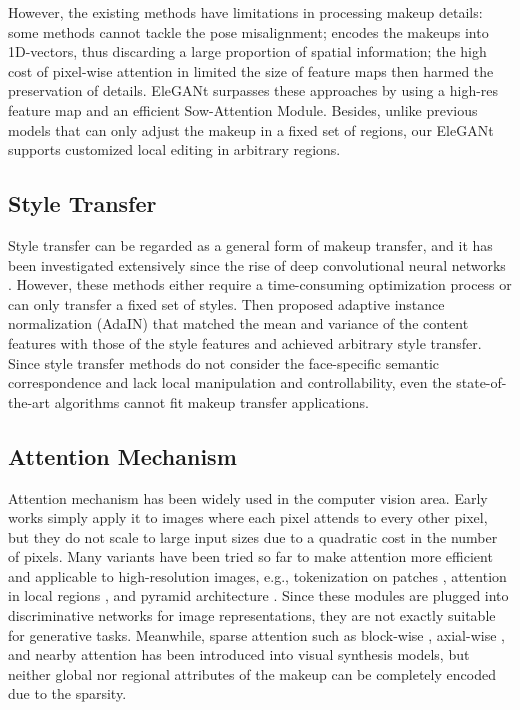 However, the existing methods have limitations in processing makeup details: some methods \cite{BeautyGAN,LADN} cannot tackle the pose misalignment; \cite{SCGAN} encodes the makeups into 1D-vectors, thus discarding a large proportion of spatial information; the high cost of pixel-wise attention in \cite{PSGAN,FAT} limited the size of feature maps then harmed the preservation of details.
EleGANt surpasses these approaches by using a high-res feature map and an efficient Sow-Attention Module. Besides, unlike previous models \cite{PSGAN,SCGAN} that can only adjust the makeup in a fixed set of regions, our EleGANt supports customized local editing in arbitrary regions.

\subsection{Style Transfer}
Style transfer can be regarded as a general form of makeup transfer, and it has been investigated extensively since the rise of deep convolutional neural networks \cite{DIA,NeuralTransfer,PerceptualLoss,phototransfer}. However, these methods either require a time-consuming optimization process or can only transfer a fixed set of styles. 
Then \cite{AdaIN} proposed adaptive instance normalization (AdaIN) that matched the mean and variance of the content features with those of the style features and achieved arbitrary style transfer. Since style transfer methods do not consider the face-specific semantic correspondence and lack local manipulation and controllability, even the state-of-the-art algorithms \cite{style-1,style-2,style-3} cannot fit makeup transfer applications.

\subsection{Attention Mechanism}

Attention mechanism has been widely used in the computer vision area. Early works \cite{vattn-1,vattn-2} simply apply it to images where each pixel attends to every other pixel, but they do not scale to large input sizes due to a quadratic cost in the number of pixels. Many variants have been tried so far to make attention more efficient and applicable to high-resolution images, e.g., tokenization on patches \cite{ViT,T2T}, attention in local regions \cite{local-attn-1,Swin,ViL,Twins}, and pyramid architecture \cite{PVT,PiT,R2L}. Since these modules are plugged into discriminative networks for image representations, they are not exactly suitable for generative tasks. Meanwhile, sparse attention such as block-wise \cite{block-1,block-2}, axial-wise \cite{axial-1,GODIVA}, and nearby attention \cite{NUWA} has been introduced into visual synthesis models, but neither global nor regional attributes of the makeup can be completely encoded due to the sparsity.

